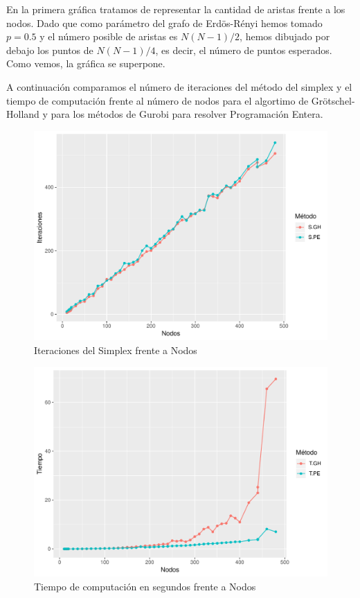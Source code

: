 \documentclass[twoside,a4paper,openright,12pt]{book}
\begin{document}
En la primera gráfica tratamos de representar la cantidad de aristas frente a los nodos. Dado que como parámetro del grafo de Erdös-Rényi hemos tomado $p=0.5$ y el número posible de aristas es $N(N-1)/2$, hemos dibujado por debajo los puntos de $N(N-1)/4$, es decir, el número de puntos esperados. Como vemos, la gráfica se superpone.

A continuación comparamos el número de iteraciones del método del simplex y el tiempo de computación frente al número de nodos para el algortimo de Grötschel-Holland y para los métodos de Gurobi para resolver Programación Entera.
\newpage
\begin{figure}[h!]
\centering
\includegraphics[scale=0.65]{plot2}
\caption{Iteraciones del Simplex frente a Nodos}
\end{figure}

\begin{figure}[h!]
\centering
\includegraphics[scale=0.65]{plot3}
\caption{Tiempo de computación en segundos frente a Nodos}
\end{figure}
\end{document}
